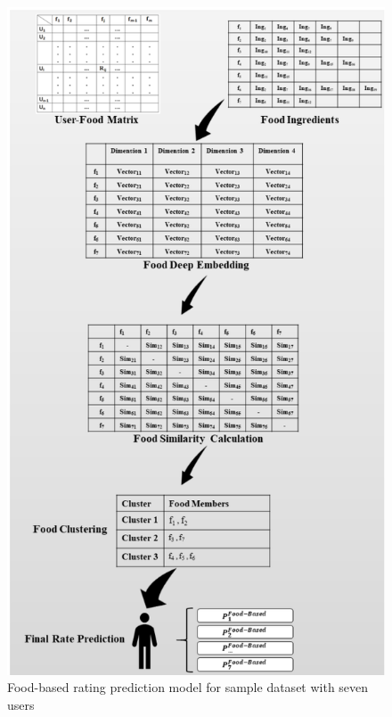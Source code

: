\begin{figure}[htp]
    \centering
    \includegraphics[scale=0.80]{overall_schema_food_based_rating_prediction.png}
    \caption{Food-based rating prediction model for sample dataset with seven users}
    \label{fig:Food-based rating prediction model}
\end{figure}


